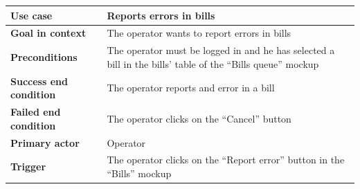 {{{			\begin{center}
			\begin{tabular}{|p{4cm}|p{10cm}|}
			\hline
				\centering \vspace{1mm} \bfseries{Use case} \vspace{1mm} & 
				\vspace{1mm} Reports errors in bills \vspace{1mm}\\
			\hline
				\centering \vspace{1mm} \bfseries{Goal in context} \vspace{1mm} & 
				\vspace{1mm} The operator wants to report errors in bills  \vspace{1mm}\\
			\hline
				\centering \vspace{1mm} \bfseries{Preconditions} \vspace{1mm} & 
				\vspace{1mm} The operator must be logged in and he has selected a bill in the bills’ table of the “Bills queue” mockup \vspace{1mm}\\
			\hline
				\centering \vspace{1mm} \bfseries{Success end condition} \vspace{1mm} & 
				\vspace{1mm} The operator reports and error in a bill \vspace{1mm}\\
			\hline
				\centering \vspace{1mm} \bfseries{Failed end condition} \vspace{1mm} & 
				\vspace{1mm} The operator clicks on the “Cancel” button \vspace{1mm}\\
			\hline
				\centering \vspace{1mm} \bfseries{Primary actor} \vspace{1mm} & 
				\vspace{1mm} Operator \vspace{1mm}\\
			\hline
				\centering \vspace{1mm} \bfseries{Trigger} \vspace{1mm} & 
				\vspace{1mm} The operator clicks on the “Report error” button in the “Bills”  mockup \vspace{1mm}\\
			\hline
			\end{tabular}


\end{center}}}}
